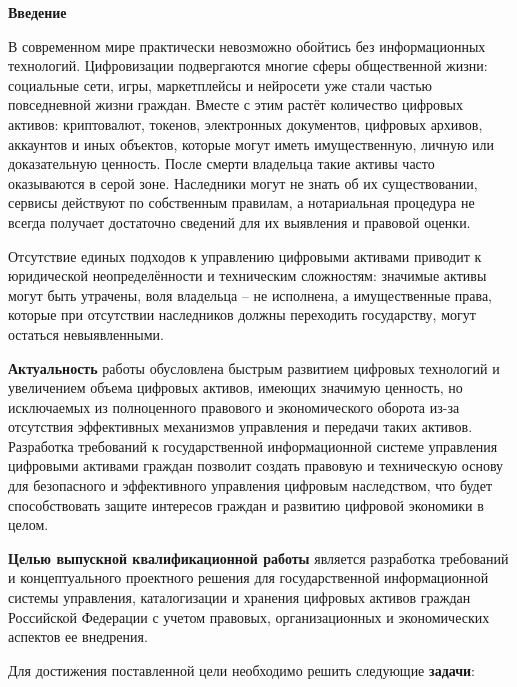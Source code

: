 \newpage
\onehalfspacing
\setcounter{page}{2}
\renewcommand{\contentsname}{\centerline{\large Содержание}}
\tableofcontents



\newpage
\begin{center}
  \textbf{\large Введение}
\end{center}

В современном мире практически невозможно обойтись без информационных технологий. Цифровизации подвергаются многие сферы общественной жизни: социальные сети, игры, маркетплейсы и нейросети уже стали частью повседневной жизни граждан. Вместе с этим растёт количество цифровых активов: криптовалют, токенов, электронных документов, цифровых архивов, аккаунтов и иных объектов, которые могут иметь имущественную, личную или доказательную ценность. После смерти владельца такие активы часто оказываются в серой зоне. Наследники могут не знать об их существовании, сервисы действуют по собственным правилам, а нотариальная процедура не всегда получает достаточно сведений для их выявления и правовой оценки.

Отсутствие единых подходов к управлению цифровыми активами приводит к юридической неопределённости и техническим сложностям: значимые активы могут быть утрачены, воля владельца -- не исполнена, а имущественные права, которые при отсутствии наследников должны переходить государству, могут остаться невыявленными.

\textbf{Актуальность} работы обусловлена быстрым развитием цифровых технологий и увеличением объема цифровых активов, имеющих значимую ценность, но исключаемых из полноценного правового и экономического оборота из-за отсутствия эффективных механизмов управления и передачи таких активов. Разработка требований к государственной информационной системе управления цифровыми активами граждан позволит создать правовую и техническую основу для безопасного и эффективного управления цифровым наследством, что будет способствовать защите интересов граждан и развитию цифровой экономики в целом.

\textbf{Целью выпускной квалификационной работы} является разработка требований и концептуального проектного решения для государственной информационной системы управления, каталогизации и хранения цифровых активов граждан Российской Федерации с учетом правовых, организационных и экономических аспектов ее внедрения.

Для достижения поставленной цели необходимо решить следующие \textbf{задачи}:

